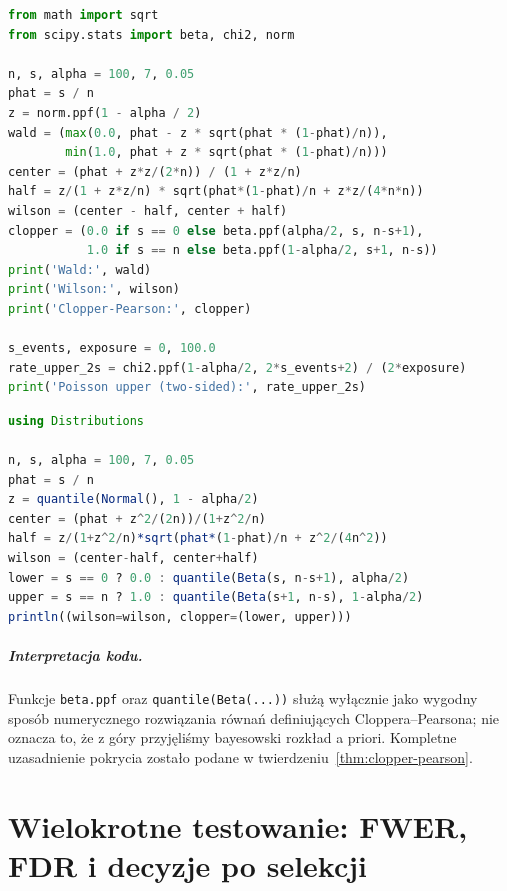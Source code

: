 \documentclass[11pt,a4paper,oneside]{report}
\numberwithin{equation}{chapter}
\theoremstyle{plain}
\theoremstyle{definition}
\theoremstyle{remark}
\begin{document}
\begin{lstlisting}[language=Python,caption={Porównanie przedziałów Walda, Wilsona i Cloppera--Pearsona oraz granica dla Poissona (SciPy).}]
from math import sqrt
from scipy.stats import beta, chi2, norm

n, s, alpha = 100, 7, 0.05
phat = s / n
z = norm.ppf(1 - alpha / 2)
wald = (max(0.0, phat - z * sqrt(phat * (1-phat)/n)),
        min(1.0, phat + z * sqrt(phat * (1-phat)/n)))
center = (phat + z*z/(2*n)) / (1 + z*z/n)
half = z/(1 + z*z/n) * sqrt(phat*(1-phat)/n + z*z/(4*n*n))
wilson = (center - half, center + half)
clopper = (0.0 if s == 0 else beta.ppf(alpha/2, s, n-s+1),
           1.0 if s == n else beta.ppf(1-alpha/2, s+1, n-s))
print('Wald:', wald)
print('Wilson:', wilson)
print('Clopper-Pearson:', clopper)

s_events, exposure = 0, 100.0
rate_upper_2s = chi2.ppf(1-alpha/2, 2*s_events+2) / (2*exposure)
print('Poisson upper (two-sided):', rate_upper_2s)
\end{lstlisting}

\begin{lstlisting}[language=Julia,caption={Przedział Wilsona i dokładny przedział dwumianowy w Julii (Distributions.jl).}]
using Distributions

n, s, alpha = 100, 7, 0.05
phat = s / n
z = quantile(Normal(), 1 - alpha/2)
center = (phat + z^2/(2n))/(1+z^2/n)
half = z/(1+z^2/n)*sqrt(phat*(1-phat)/n + z^2/(4n^2))
wilson = (center-half, center+half)
lower = s == 0 ? 0.0 : quantile(Beta(s, n-s+1), alpha/2)
upper = s == n ? 1.0 : quantile(Beta(s+1, n-s), 1-alpha/2)
println((wilson=wilson, clopper=(lower, upper)))
\end{lstlisting}

\paragraph{Interpretacja kodu.}
Funkcje \texttt{beta.ppf} oraz \texttt{quantile(Beta(...))}
służą wyłącznie jako wygodny sposób numerycznego
rozwiązania równań definiujących Cloppera--Pearsona;
nie oznacza to, że z góry przyjęliśmy bayesowski rozkład
a priori. Kompletne uzasadnienie pokrycia zostało podane
w twierdzeniu~\ref{thm:clopper-pearson}.


\chapter{Wielokrotne testowanie: FWER, FDR i decyzje po selekcji}
\label{ch:multiple-testing}
\end{document}
